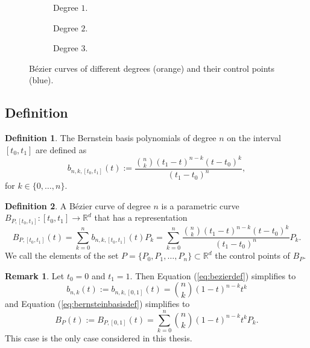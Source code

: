 \documentclass[a4paper, 11pt]{report}
\theoremstyle{definition}
\newtheorem{definition}{Definition}[section]
\newtheorem*{remark}{Remark}
\begin{document}
	\begin{figure}[H]
		\centering
		\begin{subfigure}{0.25\textwidth}
			
			\caption{Degree $1$.}
		\end{subfigure}
		\begin{subfigure}{0.25\textwidth}
			
			\caption{Degree $2$.}
		\end{subfigure}
		\begin{subfigure}{0.25\textwidth}
			
			\caption{Degree $3$.}
		\end{subfigure}
		\caption{Bézier curves of different degrees (orange) and their control points (blue).}
		\label{fig:bezierdifferentdegrees}
	\end{figure}

\subsection{Definition}
	\begin{definition}
		The Bernstein basis polynomials of degree $n$ on the interval $[t_0,t_1]$ are defined as
		\begin{equation}\label{eq:bernsteinbasisdef}
			b_{n,k,[t_0, t_1]}(t) := \frac{\binom{n}{k} (t_1-t)^{n-k}(t-t_0)^k}{(t_1-t_0)^n},
		\end{equation}
		for $k \in \{0,\dots, n\}$.
	\end{definition}

	\begin{definition}
		A Bézier curve of degree $n$ is a parametric curve $B_{P,[t_0, t_1]}: [t_0, t_1] \rightarrow \mathbb{R}^d$ that has a representation
		\begin{equation}\label{eq:bezierdef}
			B_{P, [t_0, t_1]}(t) = \sum_{k=0}^n b_{n,k,[t_0, t_1]}(t) P_k = \sum_{k=0}^n \frac{\binom{n}{k} (t_1-t)^{n-k}(t-t_0)^k}{(t_1-t_0)^n} P_k.
		\end{equation}
		We call the elements of the set $P = \{P_0, P_1, \dots, P_n\} \subset \mathbb{R}^d$ the control points of $B_P$.
	\end{definition}

	\begin{remark}
		Let $t_0 = 0$ and $t_1 = 1$. Then Equation (\ref{eq:bezierdef}) simplifies to
		\begin{equation*}
			b_{n,k}(t) := b_{n,k,[0,1]}(t) = \binom{n}{k} (1-t)^{n-k}t^k
		\end{equation*}
		and Equation (\ref{eq:bernsteinbasisdef}) simplifies to
		\begin{equation}\label{eq:bezierdefshort}
			B_P(t) := B_{P,[0,1]}(t)= \sum_{k=0}^n \binom{n}{k} (1-t)^{n-k}t^k P_k.
		\end{equation}
		This case is the only case considered in this thesis.
	\end{remark}
\end{document}
